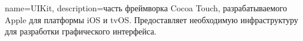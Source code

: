 
{
  name={UIKit},
  description={часть фреймворка Cocoa Touch, разрабатываемого Apple для платформы iOS и tvOS. Предоставляет необходимую инфраструктуру для разработки графического интерфейса.}
}

\glsaddall